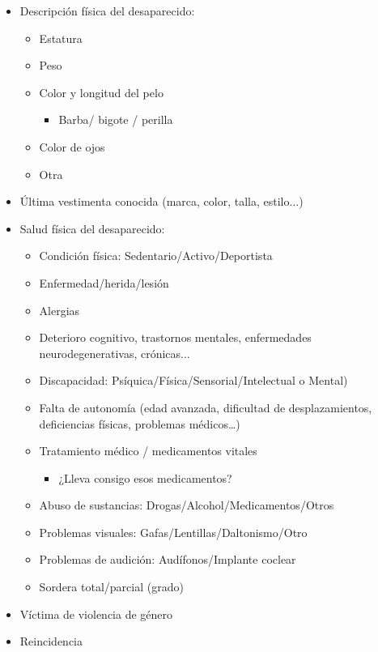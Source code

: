 \begin{itemize}
    \item Descripción física del desaparecido:
    \begin{itemize}
        \item Estatura
        \item Peso
        \item Color y longitud del pelo
        \begin{itemize}
            \item Barba/ bigote / perilla
        \end{itemize}
        \item Color de ojos
        \item Otra
    \end{itemize}
    \item Última vestimenta conocida (marca, color, talla, estilo...)
    \item Salud física del desaparecido:
    \begin{itemize}
        \item Condición física: Sedentario/Activo/Deportista
        \item Enfermedad/herida/lesión
        \item Alergias
        \item Deterioro cognitivo, trastornos mentales, enfermedades neurodegenerativas, crónicas...
        \item Discapacidad: Psíquica/Física/Sensorial/Intelectual o Mental)
        \item Falta de autonomía (edad avanzada, dificultad de desplazamientos, deficiencias físicas, problemas médicos…)
        \item Tratamiento médico / medicamentos vitales
        \begin{itemize}
            \item ¿Lleva consigo esos medicamentos?
        \end{itemize}
        \item Abuso de sustancias: Drogas/Alcohol/Medicamentos/Otros
        \item Problemas visuales: Gafas/Lentillas/Daltonismo/Otro
        \item Problemas de audición: Audífonos/Implante coclear
        \item Sordera total/parcial (grado)
    \end{itemize}
    \item Víctima de violencia de género
    \item Reincidencia
\end{itemize}


